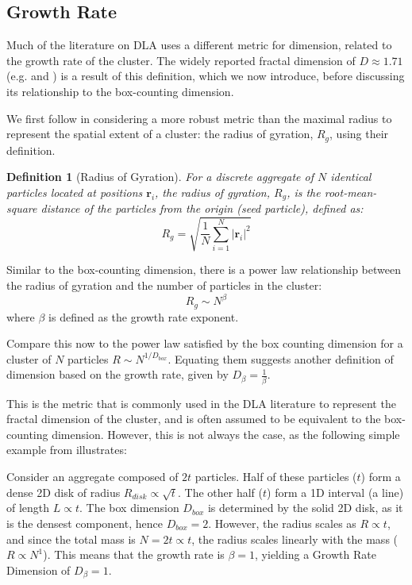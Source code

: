 \documentclass[12pt, a4paper, oneside]{report}
\newtheorem{definition}[theorem]{Definition}
\theoremstyle{remark}
\begin{document}
\subsection{Growth Rate}

Much of the literature on DLA uses a different metric for dimension, related to the growth rate of the cluster. The widely reported fractal dimension of $D \approx 1.71$ (e.g. \cite{ossadnik1991} and \cite{menshutin2006}) is a result of this definition, which we now introduce, before discussing its relationship to the box-counting dimension.

We first follow \cite{Grebenkov2017} in considering a more robust metric than the maximal radius to represent the spatial extent of a cluster: the radius of gyration, $R_g$, using their definition. 

\begin{definition}[Radius of Gyration]
For a discrete aggregate of $N$ identical particles located at positions $\mathbf{r}_i$, the radius of gyration, $R_g$, is the root-mean-square distance of the particles from the origin (seed particle), defined as:
\begin{equation*}
    R_g = \sqrt{\frac{1}{N} \sum_{i=1}^N |\mathbf{r}_i |^2}
\end{equation*}
\end{definition}

Similar to the box-counting dimension, there is a power law relationship between the radius of gyration and the number of particles in the cluster:
\begin{equation*}
    R_g \sim N^\beta
\end{equation*}
where $\beta$ is defined as the growth rate exponent.

Compare this now to the power law satisfied by the box counting dimension for a cluster of $N$ particles $R \sim N^{1/D_{box}}$. Equating them suggests another definition of dimension based on the growth rate, given by $D_\beta = \frac{1}{\beta}$.

This is the metric that is commonly used in the DLA literature to represent the fractal dimension of the cluster, and is often assumed to be equivalent to the box-counting dimension. However, this is not always the case, as the following simple example from \cite{Grebenkov2017} illustrates:

Consider an aggregate composed of $2t$ particles. Half of these particles ($t$) form a dense 2D disk of radius $R_{disk} \propto \sqrt{t}$. The other half ($t$) form a 1D interval (a line) of length $L \propto t$.
The box dimension $D_{box}$ is determined by the solid 2D disk, as it is the densest component, hence $D_{box} = 2$. However, the radius scales as $R \propto t$, and since the total mass is $N = 2t \propto t$, the radius scales linearly with the mass ($R \propto N^1$). This means that the growth rate is $\beta = 1$, yielding a Growth Rate Dimension of $D_\beta = 1$.
\end{document}
